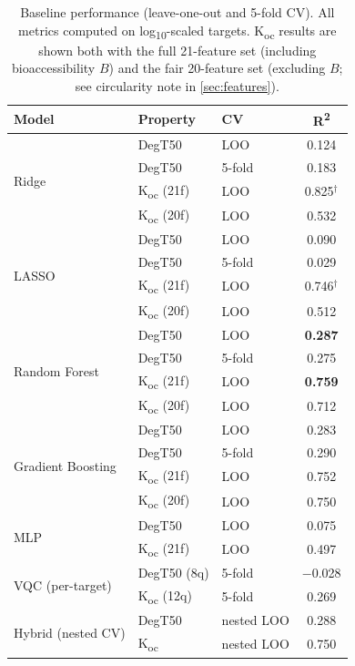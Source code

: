 \documentclass[twoside,twocolumn,9pt]{article}
\newcommand{\degtl}{DegT50}
\newcommand{\koc}{K\textsubscript{oc}}
\newcommand{\rtwo}{R\textsuperscript{2}}
\begin{document}
\begin{table}[htbp]
  \centering
  \caption{Baseline performance (leave-one-out and 5-fold CV).
           All metrics computed on log\textsubscript{10}-scaled targets.
           \koc{} results are shown both with the full 21-feature set
           (including bioaccessibility $B$) and the fair 20-feature set
           (excluding $B$; see circularity note in \ref{sec:features}).}
  \label{tab:baselines}
  \small
  \begin{tabular}{lllc}
    \toprule
    \textbf{Model} & \textbf{Property} & \textbf{CV} &
      \textbf{\rtwo{}} \\
    \midrule
    \multirow{4}{*}{Ridge}
      & \degtl{}         & LOO    & 0.124   \\
      & \degtl{}         & 5-fold & 0.183   \\
      & \koc{} (21f)     & LOO    & 0.825$^\dagger$ \\
      & \koc{} (20f)     & LOO    & 0.532   \\
    \midrule
    \multirow{4}{*}{LASSO}
      & \degtl{}         & LOO    & 0.090   \\
      & \degtl{}         & 5-fold & 0.029   \\
      & \koc{} (21f)     & LOO    & 0.746$^\dagger$ \\
      & \koc{} (20f)     & LOO    & 0.512   \\
    \midrule
    \multirow{4}{*}{Random Forest}
      & \degtl{}         & LOO    & \textbf{0.287}   \\
      & \degtl{}         & 5-fold & 0.275   \\
      & \koc{} (21f)     & LOO    & \textbf{0.759}   \\
      & \koc{} (20f)     & LOO    & 0.712   \\
    \midrule
    \multirow{4}{*}{Gradient Boosting}
      & \degtl{}         & LOO    & 0.283   \\
      & \degtl{}         & 5-fold & 0.290   \\
      & \koc{} (21f)     & LOO    & 0.752   \\
      & \koc{} (20f)     & LOO    & 0.750   \\
    \midrule
    \multirow{2}{*}{MLP}
      & \degtl{}         & LOO    & 0.075   \\
      & \koc{} (21f)     & LOO    & 0.497   \\
    \midrule
    \multirow{2}{*}{VQC (per-target)}
      & \degtl{} (8q)    & 5-fold & $-$0.028 \\
      & \koc{} (12q)     & 5-fold & 0.269   \\
    \midrule
    \multirow{2}{*}{Hybrid (nested CV)}
      & \degtl{}         & nested LOO & 0.288   \\
      & \koc{}           & nested LOO & 0.750   \\
    \bottomrule
  \end{tabular}


\end{table}
\end{document}
